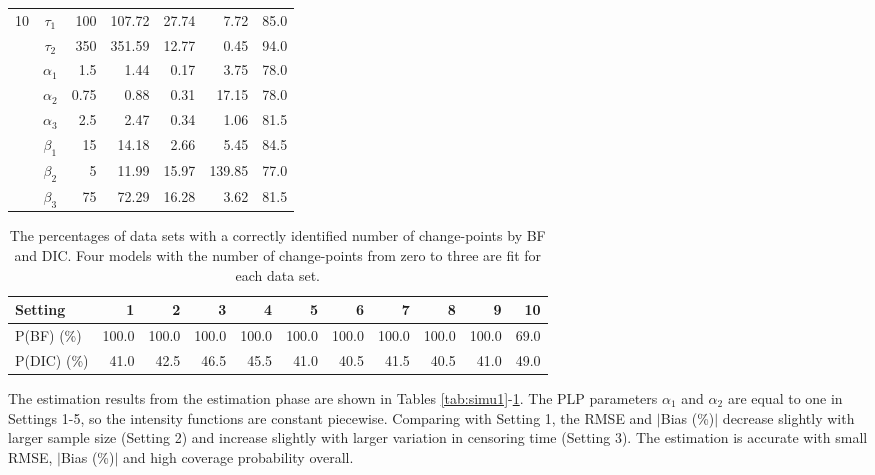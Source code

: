 \documentclass[12pt]{article}
\numberwithin{equation}{section}
\begin{document}
\begin{table}[htbp]
\begin{tabular}{ccrrrrr}
		\multirow{8}[2]{*}{10} 
		& $\tau_1$	     & 100   & 107.72 & 27.74 & 7.72  & 85.0 \\		
		& $\tau_2$	                 & 350   & 351.59 & 12.77 & 0.45  & 94.0 \\		
		& $\alpha_1$	                 & 1.5   & 1.44  & 0.17  & 3.75  & 78.0 \\		
		& $\alpha_2$	        & 0.75  & 0.88  & 0.31  & 17.15 & 78.0 \\		
		& $\alpha_3$	                 & 2.5   & 2.47  & 0.34  & 1.06  & 81.5 \\		
		& $\beta_1$	         & 15    & 14.18 & 2.66  & 5.45  & 84.5 \\		
		& $\beta_2$	         & 5     & 11.99 & 15.97 & 139.85 & 77.0 \\		
		& $\beta_3$	            & 75    & 72.29 & 16.28 & 3.62  & 81.5 \\		
		
		\hline
	\end{tabular}%
	\label{tab:simu2}%
\end{table}%


\begin{table}[htbp]
	\centering
	\caption{The percentages of data sets with a correctly identified number of change-points by BF and DIC. Four models with the number of change-points from zero to three are fit for each data set.}
	\begin{tabular}{p{5.235em}rrrrrrrrrr}
		\hline
		Setting & 1 &2 & 3 & 4 & 5     & 6     & 7     & 8     & 9&10 \\
		\hline
		P(BF) (\%) & 100.0   & 100.0  & 100.0  & 100.0   & 100.0   & 100.0   & 100.0   & 100.0   & 100.0   & 69.0 \\
		P(DIC) (\%) & 41.0   & 42.5  & 46.5  & 45.5   & 41.0     & 40.5   & 41.5   & 40.5 & 41.0   & 49.0 \\
		\hline
	\end{tabular}%
	\label{tab:simu3}%
\end{table}%

The estimation results from the estimation phase are shown in Tables \ref{tab:simu1}-\ref{tab:simu2}. The PLP parameters $\alpha_1$ and $\alpha_2$ are equal to one in Settings 1-5, so the intensity functions are constant piecewise. Comparing with Setting 1, the RMSE and $|$Bias (\%)$|$ decrease slightly with larger sample size (Setting 2) and increase slightly with larger variation in censoring time (Setting 3). The estimation is accurate with small RMSE, $|$Bias (\%)$|$ and high coverage probability overall. 
\end{document}
